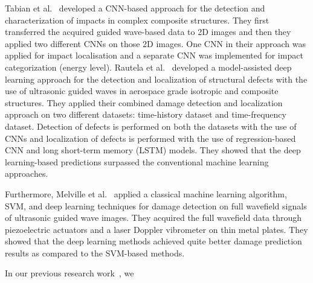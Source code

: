 Tabian et al.~\cite{tabian2019convolutional} developed a CNN-based approach for the detection and characterization of impacts in complex composite structures.
They first transferred the acquired guided wave-based data to 2D images and then they applied two different CNNs on those 2D images.
One CNN in their approach was applied for impact localisation and a separate CNN was implemented for impact categorization (energy level).
Rautela et al.~\cite{rautela2021ultrasonic} developed a model-assisted deep learning approach for the detection and localization of structural defects
with the use of ultrasonic guided waves in aerospace grade isotropic and composite structures. 
They applied their combined damage detection and localization approach on two different datasets: time-history dataset and time-frequency dataset. 
Detection of defects is performed on both the datasets with the use of CNNs and localization of defects is performed with the use of regression-based CNN and long short-term memory (LSTM) models. 
They showed that the deep learning-based predictions surpassed the conventional machine learning approaches.

Furthermore, Melville et al.~\cite{melville2018structural} applied a classical machine learning algorithm, SVM, and deep learning techniques for damage detection on full wavefield signals of ultrasonic guided wave images.
They acquired the full wavefield data through piezoelectric actuators and a laser Doppler vibrometer on thin metal plates. 
They showed that the deep learning methods achieved quite better damage prediction results as compared to the SVM-based methods. 

In our previous research work~\cite{ijjeh2021full}, we 



